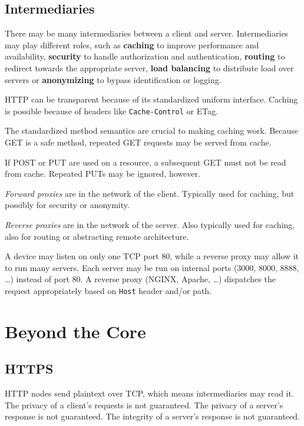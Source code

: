 \documentclass{report}
\begin{document}
\subsection{Intermediaries}

There may be many intermediaries between a client and server.
Intermediaries may play different roles,
such as \textbf{caching} to improve performance and availability,
\textbf{security} to handle authorization and authentication,
\textbf{routing} to redirect towards the appropriate server,
\textbf{load balancing} to distribute load over servers or
\textbf{anonymizing} to bypass identification or logging.

HTTP can be transparent
because of its standardized uniform interface.
Caching is possible because of headers
like \texttt{Cache-Control} or {ETag}.

The standardized method semantics are crucial
to making caching work.
Because GET is a safe method,
repeated GET requests may be served from cache.

If POST or PUT are used on a resource,
a subsequent GET must not be read from cache.
Repeated PUTs may be ignored, however.

\emph{Forward proxies} are in the network of the client.
Typically used for caching,
but possibly for security or anonymity.

\emph{Reverse proxies} are in the network of the server.
Also typically used for caching,
also for routing or abstracting remote architecture.

A device may listen on only one TCP port 80,
while a reverse proxy may allow it to run many servers.
Each server may be run on internal ports (3000, 8000, 8888, \dots)
instead of port 80.
A reverse proxy (NGINX, Apache, \dots) dispatches
the request appropriately based on \texttt{Host} header and/or path.

\section{Beyond the Core}

\subsection{HTTPS}

HTTP nodes send plaintext over TCP,
which means intermediaries may read it.
The privacy of a client's requests is not guaranteed.
The privacy of a server's response is not guaranteed.
The integrity of a server's response is not guaranteed.
\end{document}
